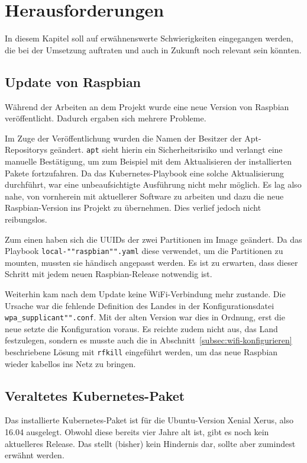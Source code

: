 \section{Herausforderungen}

In diesem Kapitel soll auf erwähnenswerte Schwierigkeiten eingegangen werden, die bei der Umsetzung auftraten und auch in Zukunft noch relevant sein könnten.

\subsection{Update von Raspbian}

Während der Arbeiten an dem Projekt wurde eine neue Version von Raspbian veröffentlicht.
Dadurch ergaben sich mehrere Probleme.

Im Zuge der Veröffentlichung wurden die Namen der Besitzer der Apt-Repositorys geändert.
\texttt{apt} sieht hierin ein Sicherheitsrisiko und verlangt eine manuelle Bestätigung, um zum Beispiel mit dem Aktualisieren der installierten Pakete fortzufahren.
Da das Kubernetes-Playbook eine solche Aktualisierung durchführt, war eine unbeaufsichtigte Ausführung nicht mehr möglich.
Es lag also nahe, von vornherein mit aktuellerer Software zu arbeiten und dazu die neue Raspbian-Version ins Projekt zu übernehmen.
Dies verlief jedoch nicht reibungslos.

Zum einen haben sich die UUIDs der zwei Partitionen im Image geändert.
Da das Playbook \texttt{local-""raspbian"".yaml} diese verwendet, um die Partitionen zu mounten, mussten sie händisch angepasst werden.
Es ist zu erwarten, dass dieser Schritt mit jedem neuen Raspbian-Release notwendig ist.

Weiterhin kam nach dem Update keine WiFi-Verbindung mehr zustande.
Die Ursache war die fehlende Definition des Landes in der Konfigurationsdatei \texttt{wpa\_supplicant"".conf}.
Mit der alten Version war dies in Ordnung, erst die neue setzte die Konfiguration voraus.
Es reichte zudem nicht aus, das Land festzulegen, sondern es musste auch die in Abschnitt~\ref{subsec:wifi-konfigurieren} beschriebene Lösung mit \texttt{rfkill} eingeführt werden, um das neue Raspbian wieder kabellos ins Netz zu bringen.

\subsection{Veraltetes Kubernetes-Paket}

Das installierte Kubernetes-Paket ist für die Ubuntu-Version Xenial Xerus, also 16.04 ausgelegt.
Obwohl diese bereits vier Jahre alt ist, gibt es noch kein aktuelleres Release.
Das stellt (bisher) kein Hindernis dar, sollte aber zumindest erwähnt werden.